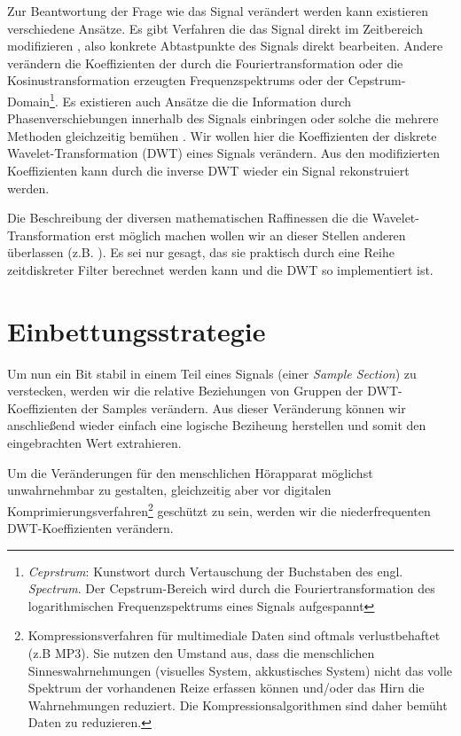 Zur Beantwortung der Frage wie das Signal ver\"andert werden kann existieren verschiedene Ans\"atze. Es gibt Verfahren die das Signal direkt im Zeitbereich modifizieren \cite{bassia2001robust}\cite{lie2006robust}, also konkrete Abtastpunkte des Signals direkt bearbeiten. Andere ver\"andern die Koeffizienten der durch die Fouriertransformation oder die Kosinustransformation erzeugten Frequenzspektrums \cite{chang2012location}\cite{??} oder der Cepstrum-Domain\footnote{\textit{Ceprstrum}: Kunstwort durch Vertauschung der Buchstaben des engl. \textit{Spectrum}. Der Cepstrum-Bereich wird durch die Fouriertransformation des logarithmischen Frequenzspektrums eines Signals aufgespannt}\cite{lee2000digital}\cite{li2000transparent}. Es existieren auch Ans\"atze die die Information durch Phasenverschiebungen innerhalb des Signals einbringen \cite{dong2004data}\cite{ansari2004data} oder solche die mehrere Methoden gleichzeitig bem\"uhen \cite{chang2012location}\cite{lei2012multipurpose}. Wir wollen hier die Koeffizienten der diskrete Wavelet-Transformation (DWT) eines Signals ver\"andern. Aus den modifizierten Koeffizienten kann durch die inverse DWT wieder ein Signal rekonstruiert werden. 
	
Die Beschreibung der diversen mathematischen Raffinessen die die Wavelet-Transformation erst m\"oglich machen wollen wir an dieser Stellen anderen \"uberlassen (z.B. \cite{??}). Es sei nur gesagt, das sie praktisch durch eine Reihe zeitdiskreter Filter berechnet werden kann und die DWT so implementiert ist. 

\section{Einbettungsstrategie}
\label{sec:embeddingstragety}

Um nun ein Bit stabil in einem Teil eines Signals (einer \textit{Sample Section}) zu verstecken, werden wir die relative Beziehungen von Gruppen der DWT-Koeffizienten der Samples verändern. Aus dieser Veränderung können wir anschließend wieder einfach eine logische Beziheung herstellen und somit den eingebrachten Wert extrahieren. 

Um die Veränderungen für den menschlichen Hörapparat möglichst unwahrnehmbar zu gestalten, gleichzeitig aber vor digitalen Komprimierungsverfahren\footnote{Kompressionsverfahren für multimediale Daten sind oftmals verlustbehaftet (z.B MP3). Sie nutzen den Umstand aus, dass die menschlichen Sinneswahrnehmungen (visuelles System, akkustisches System) nicht das volle Spektrum der vorhandenen Reize erfassen können und/oder das Hirn die Wahrnehmungen reduziert. Die Kompressionsalgorithmen sind daher bemüht \grqq{} Daten zu reduzieren.} geschützt zu sein, werden wir die niederfrequenten DWT-Koeffizienten verändern. 

